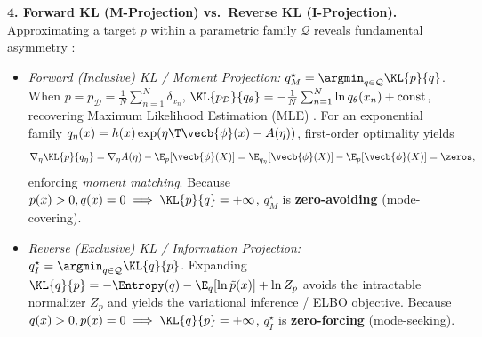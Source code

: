\documentclass[../../../../master.tex]{subfiles}
\begin{document}
\begin{coremath}
\textbf{4. Forward KL (M-Projection) vs.\ Reverse KL (I-Projection).} Approximating a target $p$ within a parametric family $\mathcal{Q}$ reveals fundamental asymmetry :
\begin{itemize}[leftmargin=1.4em]
  \item \emph{Forward (Inclusive) KL / Moment Projection:} $q_M^\star = \argmin_{q \in \mathcal{Q}} \KL{p}{q}$. When $p = p_{\mathcal{D}} = \frac{1}{N}\sum_{n=1}^N \delta_{x_n}$, $\KL{p_{\mathcal{D}}}{q_\theta} = -\frac{1}{N}\sum_{n=1}^N \ln q_\theta(x_n) + \text{const}$, recovering Maximum Likelihood Estimation (MLE)  . For an exponential family $q_\eta(x) = h(x)\exp(\eta\T \vecb{\phi}(x) - A(\eta))$, first-order optimality yields
  \begin{equation}
  \label{eq:infotheory:m_proj}
    \nabla_\eta \KL{p}{q_\eta} = \nabla_\eta A(\eta) - \E_p[\vecb{\phi}(X)] = \E_{q_\eta}[\vecb{\phi}(X)] - \E_p[\vecb{\phi}(X)] = \zeros,
  \end{equation}
  enforcing \emph{moment matching}. Because $p(x) > 0, q(x) = 0 \implies \KL{p}{q} = +\infty$, $q_M^\star$ is \textbf{zero-avoiding} (mode-covering).
  \item \emph{Reverse (Exclusive) KL / Information Projection:} $q_I^\star = \argmin_{q \in \mathcal{Q}} \KL{q}{p}$. Expanding $\KL{q}{p} = -\Entropy(q) - \E_q[\ln \tilde{p}(x)] + \ln Z_p$ avoids the intractable normalizer $Z_p$ and yields the variational inference / ELBO objective. Because $q(x) > 0, p(x) = 0 \implies \KL{q}{p} = +\infty$, $q_I^\star$ is \textbf{zero-forcing} (mode-seeking).
\end{itemize}
\end{coremath}
\end{document}

